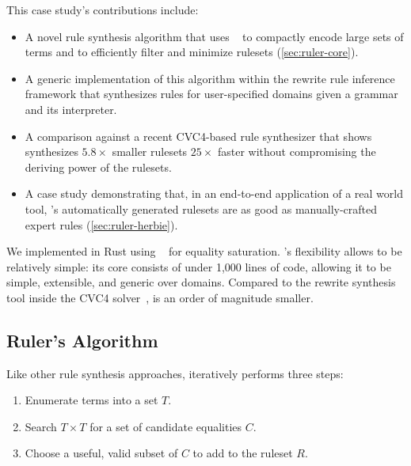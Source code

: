 This case study's contributions include:
\begin{itemize}
  \item A novel rule synthesis algorithm
    that uses \egraphs~\cite{nelson} to
    compactly encode large sets of terms and
    \eqsat to efficiently filter and minimize rulesets
    (\autoref{sec:ruler-core}).

  \item A generic implementation of
    this algorithm within the
    rewrite rule inference framework
    that synthesizes rules for user-specified domains
    given a grammar and its interpreter.

  \item A comparison against a recent CVC4-based rule synthesizer
    that shows  synthesizes $5.8\times$ smaller
    rulesets $25\times$ faster without compromising
    the deriving power of the rulesets.

  \item A case study demonstrating that,
    in an end-to-end application of a real world tool,
    's automatically generated rulesets
    are as good as manually-crafted expert rules
    (\autoref{sec:ruler-herbie}).

\end{itemize}

We implemented  in Rust
 using \egg~\cite{egg} for
 equality saturation.
\egg's flexibility allows  to be relatively simple:
 its core consists of under 1,000 lines of code,
 allowing it to be simple, extensible,
 and generic over domains.
Compared to the rewrite synthesis tool
 inside the CVC4 solver~\cite{cvc4, sat19},
  is an order of magnitude smaller.

\subsection{Ruler's Algorithm}
\label{sec:ruler-core}

Like other rule synthesis approaches,
  iteratively performs three steps:
\begin{enumerate}
    \item Enumerate terms into a set $T$.
    \item Search $T \times T$ for a set of candidate equalities $C$.
    \item Choose a useful, valid subset of $C$ to add to the ruleset $R$.
\end{enumerate}

